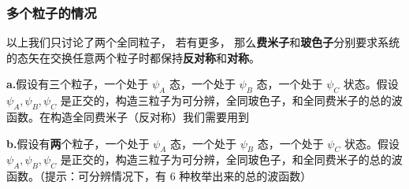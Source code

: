 \subsubsection{多个粒子的情况}
以上我们只讨论了两个全同粒子， 若有更多， 那么\textbf{费米子}和\textbf{玻色子}分别要求系统的态矢在交换任意两个粒子时都保持\textbf{反对称}和\textbf{对称}。
\begin{exercise}{}
\textbf{a.}假设有三个粒子，一个处于 $\psi_A$ 态，一个处于 $\psi_B$ 态，一个处于 $\psi_C$ 状态。假设 $\psi_A,\psi_B,\psi_C$ 是正交的，构造三粒子为可分辨，全同玻色子，和全同费米子的总的波函数。在构造全同费米子（反对称）我们需要用到

\textbf{b.}假设有\textbf{两}个粒子，一个处于 $\psi_A$ 态，一个处于 $\psi_B$ 态，一个处于 $\psi_C$ 状态。假设 $\psi_A,\psi_B,\psi_C$ 是正交的，构造三粒子为可分辨，全同玻色子，和全同费米子的总的波函数。（提示：可分辨情况下，有 $6$ 种枚举出来的总的波函数）
\end{exercise}
